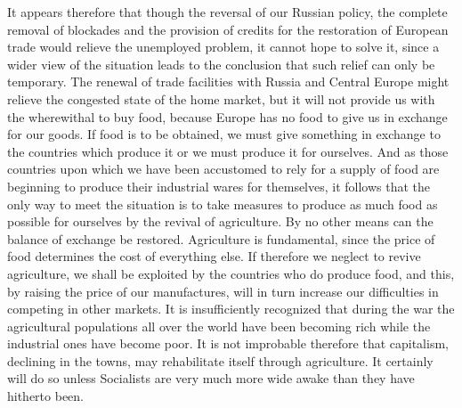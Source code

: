 \documentclass{book}
\begin{document}
It appears therefore that though the reversal of our Russian policy, the complete removal of blockades and the provision of credits for the restoration of European trade would relieve the unemployed problem, it cannot hope to solve it, since a wider view of the situation leads to the conclusion that such relief can only be temporary. The renewal of trade facilities with Russia and Central Europe might relieve the congested state of the home market, but it will not provide us with the wherewithal to buy food, because Europe has no food to give us in exchange for our goods. If food is to be obtained, we must give something in exchange to the countries which produce it or we must produce it for ourselves. And as those countries upon which we have been accustomed to rely for a supply of food are beginning to produce their industrial wares for themselves, it follows that the only way to meet the situation is to take measures to produce as much food as possible for ourselves by the revival of agriculture. By no other means can the balance of exchange be restored. Agriculture is fundamental, since the price of food determines the cost of everything else. If therefore we neglect to revive agriculture, we shall be exploited by the countries who do produce food, and this, by raising the price of our manufactures, will in turn increase our difficulties in competing in other markets. It is insufficiently recognized that during the war the agricultural populations all over the world have been becoming rich while the industrial ones have become poor. It is not improbable therefore that capitalism, declining in the towns, may rehabilitate itself through agriculture. It certainly will do so unless Socialists are very much more wide awake than they have hitherto been.
\end{document}
